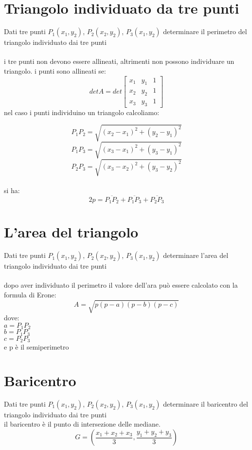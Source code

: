 \documentclass[12pt]{book}
\begin{document}
				\section{Triangolo individuato da tre punti}
				Dati tre punti
				$P_1\left(x_1,y_2\right)$, $P_2\left(x_2,y_2\right)$, $P_3\left(x_1,y_2\right)$ determinare il perimetro del triangolo individuato dai tre punti	
				\\
				\\
				i tre punti non devono essere allineati, altrimenti non possono individuare un triangolo. i punti sono allineati se:
				\[detA=det\begin{bmatrix}
					x_1&y_1&1\\
					x_2&y_2&1\\
					x_3&y_3&1
				\end{bmatrix}\]
				nel caso i punti individuino un triangolo calcoliamo:
				
				\[P_1P_2=\sqrt{(x_2-x_1)^2 + (y_2-y_1)^2}\] 
				\[P_1P_3=\sqrt{(x_3-x_1)^2 + (y_3-y_1)^2}\] 
				\[P_2P_3=\sqrt{(x_3-x_2)^2 + (y_3-y_2)^2}\] 
				\\
				si ha: \[2p =\overline{P_1P_2} +\overline{ P_1P_3}+\overline{P_2P_3}\] 
				
				\section{L'area del triangolo}
				Dati tre punti
				$P_1\left(x_1,y_2\right)$, $P_2\left(x_2,y_2\right)$, $P_3\left(x_1,y_2\right)$ determinare l'area del triangolo individuato dai tre punti	
				\\
				\\
				dopo aver individuato il perimetro il valore dell'ara può essere calcolato con la formula di Erone:
				\\
				\[A=\sqrt{p(p-a)(p-b)(p-c)}\] 
				dove:
				\\
				$a=P_1P_2$
				\\
				$b=P_1P_3$
				\\
				$c=P_2P_3$
				\\ e p è il semiperimetro
				\section{Baricentro}
				Dati tre punti
				$P_1\left(x_1,y_2\right)$, $P_2\left(x_2,y_2\right)$, $P_3\left(x_1,y_2\right)$ determinare il baricentro del triangolo individuato dai tre punti
				\\	
				il baricentro è il punto di intersezione delle mediane.
				\\
				\[G=\left(\frac{x_1+x_2+x_3}{3},\frac{y_1+y_2+y_3}{3}\right)\] 
\end{document}
